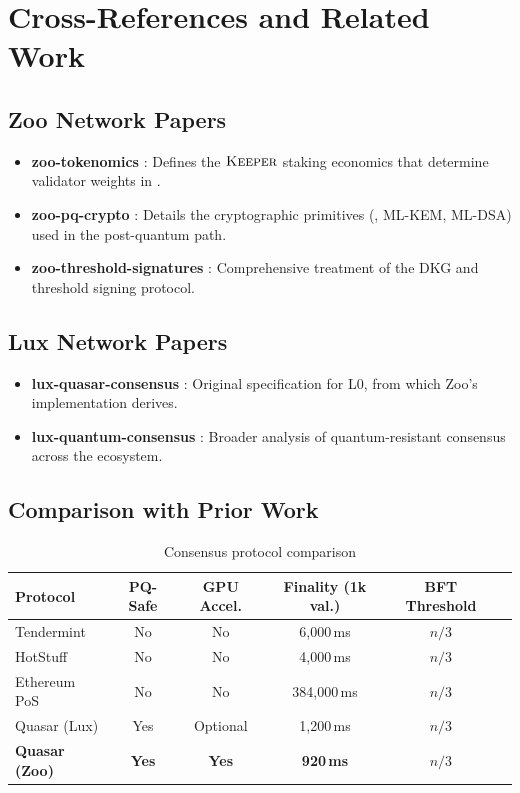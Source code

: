 \section{Cross-References and Related Work}


\subsection{Zoo Network Papers}

\begin{itemize}
\item \textbf{zoo-tokenomics} \cite{zoo-tokenomics}: Defines the $\textsc{Keeper}$ staking economics that determine validator weights in \Quasar{}.
\item \textbf{zoo-pq-crypto} \cite{zoo-pq-crypto}: Details the cryptographic primitives (\Ringtail{}, ML-KEM, ML-DSA) used in the post-quantum path.
\item \textbf{zoo-threshold-signatures} \cite{zoo-threshold-sigs}: Comprehensive treatment of the \Ringtail{} DKG and threshold signing protocol.
\end{itemize}

\subsection{Lux Network Papers}

\begin{itemize}
\item \textbf{lux-quasar-consensus} \cite{lux-quasar-consensus}: Original \Quasar{} specification for \Lux{} L0, from which Zoo's implementation derives.
\item \textbf{lux-quantum-consensus} \cite{lux-quantum-consensus}: Broader analysis of quantum-resistant consensus across the \Lux{} ecosystem.
\end{itemize}

\subsection{Comparison with Prior Work}

\begin{table}[h]
\centering
\small
\begin{tabular}{lccccc}
\toprule
\textbf{Protocol} & \textbf{PQ-Safe} & \textbf{GPU Accel.} & \textbf{Finality (1k val.)} & \textbf{BFT Threshold} \\
\midrule
Tendermint & No & No & 6,000\,ms & $n/3$ \\
HotStuff & No & No & 4,000\,ms & $n/3$ \\
Ethereum PoS & No & No & 384,000\,ms & $n/3$ \\
Quasar (Lux) & Yes & Optional & 1,200\,ms & $n/3$ \\
\textbf{Quasar (Zoo)} & \textbf{Yes} & \textbf{Yes} & \textbf{920\,ms} & $n/3$ \\
\bottomrule
\end{tabular}
\caption{Consensus protocol comparison}
\label{tab:protocol-cmp}
\end{table}

